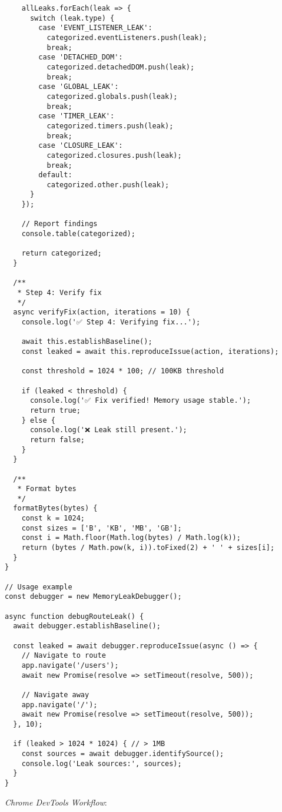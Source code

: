 \documentclass[11pt]{article}
\begin{document}
\begin{verbatim}
    allLeaks.forEach(leak => {
      switch (leak.type) {
        case 'EVENT_LISTENER_LEAK':
          categorized.eventListeners.push(leak);
          break;
        case 'DETACHED_DOM':
          categorized.detachedDOM.push(leak);
          break;
        case 'GLOBAL_LEAK':
          categorized.globals.push(leak);
          break;
        case 'TIMER_LEAK':
          categorized.timers.push(leak);
          break;
        case 'CLOSURE_LEAK':
          categorized.closures.push(leak);
          break;
        default:
          categorized.other.push(leak);
      }
    });
    
    // Report findings
    console.table(categorized);
    
    return categorized;
  }
  
  /**
   * Step 4: Verify fix
   */
  async verifyFix(action, iterations = 10) {
    console.log('✅ Step 4: Verifying fix...');
    
    await this.establishBaseline();
    const leaked = await this.reproduceIssue(action, iterations);
    
    const threshold = 1024 * 100; // 100KB threshold
    
    if (leaked < threshold) {
      console.log('✅ Fix verified! Memory usage stable.');
      return true;
    } else {
      console.log('❌ Leak still present.');
      return false;
    }
  }
  
  /**
   * Format bytes
   */
  formatBytes(bytes) {
    const k = 1024;
    const sizes = ['B', 'KB', 'MB', 'GB'];
    const i = Math.floor(Math.log(bytes) / Math.log(k));
    return (bytes / Math.pow(k, i)).toFixed(2) + ' ' + sizes[i];
  }
}

// Usage example
const debugger = new MemoryLeakDebugger();

async function debugRouteLeak() {
  await debugger.establishBaseline();
  
  const leaked = await debugger.reproduceIssue(async () => {
    // Navigate to route
    app.navigate('/users');
    await new Promise(resolve => setTimeout(resolve, 500));
    
    // Navigate away
    app.navigate('/');
    await new Promise(resolve => setTimeout(resolve, 500));
  }, 10);
  
  if (leaked > 1024 * 1024) { // > 1MB
    const sources = await debugger.identifySource();
    console.log('Leak sources:', sources);
  }
}
\end{verbatim}

\emph{Chrome DevTools Workflow}:
\end{document}
